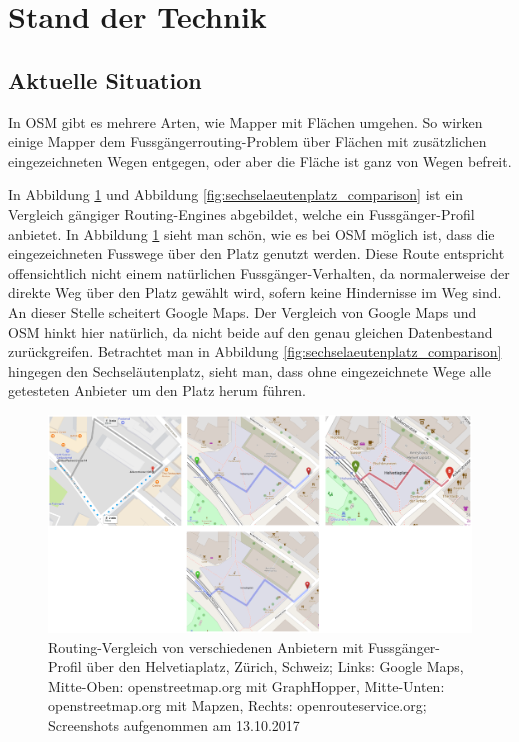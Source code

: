 \section{Stand der Technik}
\label{sec:Stand der Technik}

\subsection{Aktuelle Situation}
\label{sub:Aktuelle Situation}

In \ac{OSM} gibt es mehrere Arten, wie Mapper mit Flächen umgehen. So wirken einige Mapper dem Fussgängerrouting-Problem über Flächen mit zusätzlichen eingezeichneten Wegen entgegen, oder aber die Fläche ist ganz von Wegen befreit.

In Abbildung \ref{fig:helvetiaplatz_comparison} und Abbildung \ref{fig:sechselaeutenplatz_comparison} ist ein Vergleich gängiger Routing-Engines abgebildet, welche ein Fussgänger-Profil anbietet. In Abbildung \ref{fig:helvetiaplatz_comparison} sieht man schön, wie es bei \ac{OSM} möglich ist, dass die eingezeichneten Fusswege über den Platz genutzt werden. Diese Route entspricht offensichtlich nicht einem natürlichen Fussgänger-Verhalten, da normalerweise der direkte Weg über den Platz gewählt wird, sofern keine Hindernisse im Weg sind. An dieser Stelle scheitert Google Maps. Der Vergleich von Google Maps und \ac{OSM} hinkt hier natürlich, da nicht beide auf den genau gleichen Datenbestand zurückgreifen. Betrachtet man in Abbildung \ref{fig:sechselaeutenplatz_comparison} hingegen den Sechseläutenplatz, sieht man, dass ohne eingezeichnete Wege alle getesteten Anbieter um den Platz herum führen.

\begin{figure}[ht]
\centering
\includegraphics[width=1\linewidth]{technicalreport/img/helvetiaplatz_comparison}
\caption[Fussgänger-Routing Vergleich]{Routing-Vergleich von verschiedenen Anbietern mit Fussgänger-Profil über den Helvetiaplatz, Zürich, Schweiz; Links: Google Maps, Mitte-Oben: openstreetmap.org mit GraphHopper, Mitte-Unten: openstreetmap.org mit Mapzen, Rechts: openrouteservice.org; Screenshots aufgenommen am 13.10.2017}
\label{fig:helvetiaplatz_comparison}
\end{figure}


